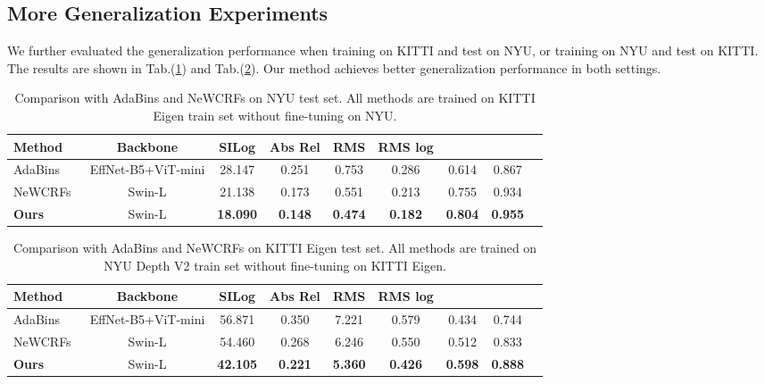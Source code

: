 \documentclass{article} \usepackage{iclr2023_conference, times}
\begin{document}
\subsection{More Generalization Experiments}

We further evaluated the generalization performance when training on KITTI and test on NYU, or training on NYU and test on KITTI. The results are shown in Tab.(\ref{tab:rebuttal_kitti2nyu}) and Tab.(\ref{tab:rebuttal_nyu2kitti}). Our method achieves better generalization performance in both settings.
\begin{table}
\begin{center}
\scriptsize
\caption{\small Comparison with AdaBins and NeWCRFs on NYU test set. All methods are trained on KITTI Eigen train set {without} fine-tuning on NYU. }
\label{tab:rebuttal_kitti2nyu}
\begin{tabular*}{1.0\textwidth}{l@{\extracolsep{\fill}}cccccccc}
\hline
Method & Backbone &SILog  & Abs Rel & RMS & RMS log &    &  \\
\hline
AdaBins\citep{bhat2021adabins} & EffNet-B5+ViT-mini & 28.147 & 0.251 & 0.753 & 0.286 & 0.614 & 0.867\\
NeWCRFs~\citep{yuan2022new} & Swin-L & 21.138 & 0.173 & 0.551 & 0.213 & 0.755 & 0.934\\
\hline
\textbf{Ours} &Swin-L & \textbf{18.090}  & \textbf{0.148} & \textbf{0.474} & \textbf{0.182} & \textbf{0.804} & \textbf{0.955}\\
\hline
\end{tabular*}
\end{center}
\end{table}


\begin{table}[h]
\begin{center}
\scriptsize
\caption{\small Comparison with AdaBins and NeWCRFs on KITTI Eigen test set. All methods are trained on NYU Depth V2 train set {without} fine-tuning on KITTI Eigen. }
\label{tab:rebuttal_nyu2kitti}
\begin{tabular*}{1.0\textwidth}{l@{\extracolsep{\fill}}cccccccc}
\hline
Method & Backbone &SILog  & Abs Rel & RMS & RMS log &    &  \\
\hline
AdaBins\citep{bhat2021adabins} & EffNet-B5+ViT-mini & 56.871 & 0.350 & 7.221 & 0.579 & 0.434 & 0.744\\
NeWCRFs~\citep{yuan2022new} & Swin-L & 54.460 & 0.268 & 6.246 & 0.550 & 0.512 & 0.833\\
\hline
\textbf{Ours} &Swin-L & \textbf{42.105}  & \textbf{0.221} & \textbf{5.360} & \textbf{0.426} & \textbf{0.598} & \textbf{0.888}\\
\hline
\end{tabular*}
\end{center}
\end{table}
\end{document}
